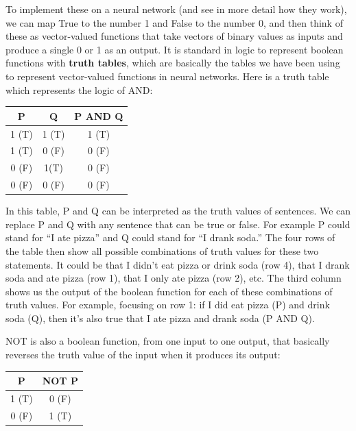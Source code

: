 To implement these on a neural network (and see in more detail how they work), we  can map True to the number 1 and False to the number 0, and then think of these as vector-valued functions that take vectors of binary values as inputs and produce a single 0 or 1 as an output. It is standard in logic to represent boolean functions with \textbf{truth tables}, which are basically the tables we have been using to represent vector-valued functions in neural networks. Here is a truth table which represents the logic of AND:

\begin{center}
\begin{tabular}{| c | c || c | }
\hline
  P  & Q & P AND Q  \\
\hline
  1 (T) & 1 (T) & 1 (T)  \\
\hline
 1 (T) & 0 (F) & 0 (F)  \\
\hline
 0 (F) & 1(T) & 0  (F) \\
\hline
 0 (F) & 0 (F) & 0 (F) \\
\hline
\end{tabular}
\end{center}

In this table,  P and Q can be interpreted as the truth values of sentences. We can replace P and Q with any sentence that can be true or false. For example P could stand for ``I ate pizza'' and Q could stand for ``I drank soda.''  The four rows of the table then show all possible combinations of truth values for these two statements. It could be that I didn't eat  pizza or drink soda (row 4), that I drank soda and ate pizza (row 1), that I only ate pizza (row 2), etc. The third column shows us the output of the boolean function for each of these combinations of truth values. For example, focusing on row 1: if I did eat pizza (P) and drink soda (Q), then it's also true that I ate pizza and drank soda (P AND Q). 

NOT is also a boolean function, from one input to one output, that basically reverses the truth value of the input when it produces its output:

\begin{center}
\begin{tabular}{| c || c | }
\hline
  P  & NOT P  \\
\hline
  1 (T) & 0 (F)  \\
\hline
 0 (F) & 1 (T)  \\
\hline
\end{tabular}
\end{center}

